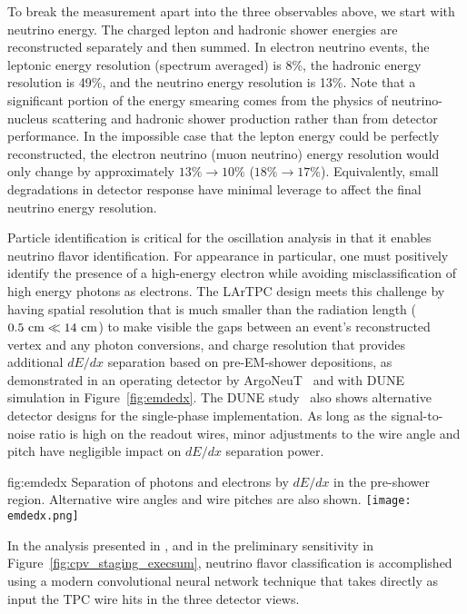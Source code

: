 To break the measurement apart into the three
observables above, we start with neutrino energy.
The charged lepton and hadronic shower energies are
reconstructed separately and then summed.  In electron
neutrino events, the leptonic energy resolution
(spectrum averaged) is 8\%, the hadronic energy resolution
is 49\%, and the neutrino energy resolution is 13\%.
Note that a significant portion of the energy smearing
comes from the physics of neutrino-nucleus scattering
and hadronic shower production rather than from detector
performance.  In the impossible case that the lepton
energy could be perfectly reconstructed, the electron
neutrino (muon neutrino) energy resolution would only
change by approximately $13\%\rightarrow 10\%$ 
($18\%\rightarrow 17\%$).
Equivalently, small degradations in detector response
have minimal leverage to affect the final neutrino energy
resolution.

Particle identification is critical for the oscillation analysis 
in that it enables neutrino flavor identification.  
For \nue{} appearance in particular, one
must positively identify the presence of a high-energy
electron while avoiding misclassification of high energy
photons as electrons. The LArTPC design meets this challenge
by having spatial resolution that is much smaller than the
radiation length ($0.5~\rm{cm} \ll 14~\rm{cm}$) to make
visible the gaps between an event's reconstructed vertex
and any photon conversions, and charge resolution that
provides additional $dE/dx$ separation based on pre-EM-shower
depositions, as demonstrated in an operating detector by
ArgoNeuT~\cite{Acciarri:2016sli} and with DUNE simulation
in Figure~\ref{fig:emdedx}.  The DUNE study~\cite{bib:docdb3384}
also shows alternative detector designs for the 
single-phase \lartpc implementation.  As long as
the signal-to-noise ratio is high on the readout wires,
minor adjustments to the wire angle and pitch have negligible
impact on $dE/dx$ separation power.
%
\begin{dunefigure}
{fig:emdedx}
{Separation of photons and electrons by $dE/dx$
in the pre-shower region.  Alternative wire angles and wire
pitches are also shown.}
  \texttt{[image: emdedx.png]}
\end{dunefigure}

In the analysis presented in \physchlbl, and in
the preliminary  sensitivity in
Figure~\ref{fig:cpv_staging_execsum}, neutrino flavor classification
is accomplished using a modern convolutional neural network
technique that takes directly as input the TPC wire hits
in the three detector views.

